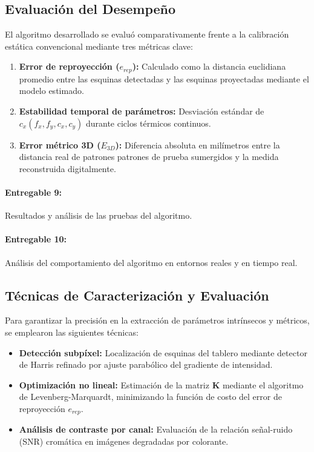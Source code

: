 \documentclass[12pt,letterpaper,spanish,twoside,openright]{report}
\begin{document}
\subsection{Evaluación del Desempeño}
El algoritmo desarrollado se evaluó comparativamente frente a la calibración estática convencional mediante tres métricas clave:
\begin{enumerate}[noitemsep]
    \item \textbf{Error de reproyección ($e_{rep}$):} Calculado como la distancia euclidiana promedio entre las esquinas detectadas y las esquinas proyectadas mediante el modelo estimado.
    \item \textbf{Estabilidad temporal de parámetros:} Desviación estándar de $c_x(f_x, f_y, c_x, c_y)$ durante ciclos térmicos continuos.
    \item \textbf{Error métrico 3D ($E_{3D}$):} Diferencia absoluta en milímetros entre la distancia real de patrones patrones de prueba sumergidos y la medida reconstruida digitalmente.
\end{enumerate}

\paragraph{Entregable 9:} Resultados y análisis de las pruebas del algoritmo.

\paragraph{Entregable 10:} Análisis del comportamiento del algoritmo en entornos reales y en tiempo real.

\subsection{Técnicas de Caracterización y Evaluación}
Para garantizar la precisión en la extracción de parámetros intrínsecos y métricos, se emplearon las siguientes técnicas:
\begin{itemize}[noitemsep]
    \item \textbf{Detección subpíxel:} Localización de esquinas del tablero mediante detector de Harris refinado por ajuste parabólico del gradiente de intensidad.
    \item \textbf{Optimización no lineal:} Estimación de la matriz $\mathbf{K}$ mediante el algoritmo de Levenberg-Marquardt, minimizando la función de costo del error de reproyección $e_{rep}$.
    \item \textbf{Análisis de contraste por canal:} Evaluación de la relación señal-ruido (SNR) cromática en imágenes degradadas por colorante.
\end{itemize}
\end{document}
